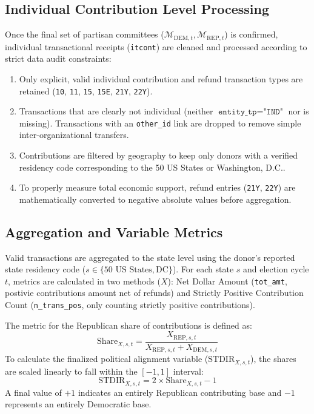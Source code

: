 \subsection{Individual Contribution Level Processing}
Once the final set of partisan committees ($\mathcal{M}_{\text{DEM}, t}, \mathcal{M}_{\text{REP}, t}$) is confirmed, individual transactional receipts (\texttt{itcont}) are cleaned and processed according to strict data audit constraints:
\begin{enumerate}
    \item Only explicit, valid individual contribution and refund transaction types are retained (\texttt{10}, \texttt{11}, \texttt{15}, \texttt{15E}, \texttt{21Y}, \texttt{22Y}).
    \item Transactions that are clearly not individual (neither $\texttt{entity\_tp} = \texttt{"IND"}$ nor is missing). Transactions with an \texttt{other\_id} link are dropped to remove simple inter-organizational transfers.
    \item Contributions are filtered by geography to keep only donors with a verified residency code corresponding to the 50 US States or Washington, D.C..
    \item To properly measure total economic support, refund entries (\texttt{21Y}, \texttt{22Y}) are mathematically converted to negative absolute values before aggregation.
\end{enumerate}

\subsection{Aggregation and Variable Metrics}
Valid transactions are aggregated to the state level using the donor's reported state residency code ($s \in \{\text{50 US States}, \text{DC}\}$). For each state $s$ and election cycle $t$, metrics are calculated in two methods ($X$): Net Dollar Amount (\texttt{tot\_amt}, postivie contributions amount net of refunds) and Strictly Positive Contribution Count (\texttt{n\_trans\_pos}, only counting strictly positive contributions). 

The metric for the Republican share of contributions is defined as:
\begin{equation}
    \text{Share}_{X, s, t} = \frac{X_{\text{REP}, s, t}}{X_{\text{REP}, s, t} + X_{\text{DEM}, s, t}}
\end{equation}
To calculate the finalized political alignment variable ($\text{STDIR}_{X, s, t}$), the shares are scaled linearly to fall within the $[-1, 1]$ interval:
\begin{equation}
    \text{STDIR}_{X, s, t} = 2 \times \text{Share}_{X, s, t} - 1
\end{equation}
A final value of $+1$ indicates an entirely Republican contributing base and $-1$ represents an entirely Democratic base.